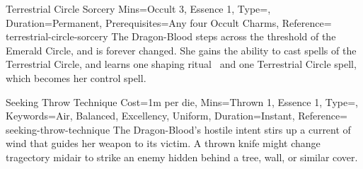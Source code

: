 
\begin{Charm}{Terrestrial Circle Sorcery}{%
    Mins={Occult 3, Essence 1},
    Type=\PermanentType,
    Duration=Permanent,
    Prerequisites=Any four Occult Charms,
    Reference=\cite*[p.~235]{db}
}{terrestrial-circle-sorcery}
    The Dragon-Blood steps across the threshold of the Emerald Circle, and is
    forever changed. She gains the ability to cast spells of the Terrestrial
    Circle, and learns one shaping ritual~\parencite*[p.~466]{ex3} and one
    Terrestrial Circle spell, which becomes her control spell.
\end{Charm}




\begin{Charm}{Seeking Throw Technique}{%
    Cost=1m per die,
    Mins={Thrown 1, Essence 1},
    Type=\SupplementalType,
    Keywords={Air, Balanced, Excellency, Uniform},
    Duration=Instant,
    Reference=\cite*[p.~275]{db}
}{seeking-throw-technique}
    The Dragon-Blood's hostile intent stirs up a current of wind that guides
    her weapon to its victim. A thrown knife might change tragectory midair to
    strike an enemy hidden behind a tree, wall, or similar cover. 

\end{Charm}


\printbibliography[title=References]


